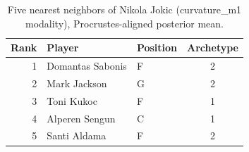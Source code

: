\begin{table}[htbp]
  \centering\small
  \begin{tabular}{rllc}
    \toprule
    Rank & Player & Position & Archetype \\
    \midrule
    1 & Domantas Sabonis & F & 2 \\
    2 & Mark Jackson & G & 2 \\
    3 & Toni Kukoc & F & 1 \\
    4 & Alperen Sengun & C & 1 \\
    5 & Santi Aldama & F & 2 \\
    \bottomrule
  \end{tabular}
  \caption{Five nearest neighbors of Nikola Jokic (curvature_m1 modality), Procrustes-aligned posterior mean.}
  \label{tab:Nikola_Jokic_neighbors_curvature_m1}
\end{table}


